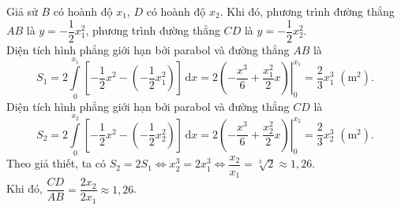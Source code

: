 \begin{ex}
{{}
Giả sử $B$ có hoành độ $x_1$,  $D$ có hoành độ $x_2$. Khi đó, phương trình đường thẳng $AB$ là $y=-\dfrac{1}{2} x_1^2$, phương trình đường thẳng $CD$ là $y=-\dfrac{1}{2} x_2^2$.\\
Diện tích hình phẳng giới hạn bởi parabol và đường thẳng $AB$ là
\[
S_1=2\displaystyle\int\limits_0^{x_1}\left[-\dfrac 12x^2-\left(-\dfrac 12x_1^2\right)\right]\mathrm{\,d} x=\left.2\left(-\dfrac{x^3}6+\dfrac{x_1^2}2x\right)\right|_0^{x_1}=\dfrac 23x_1^3\,\,\left(\mathrm{m}^2\right).
\]
Diện tích hình phẳng giới hạn bởi parabol và đường thẳng $CD$ là
\[
S_2=2\displaystyle\int\limits_0^{x_2}\left[-\dfrac 12x^2-\left(-\dfrac 12x_2^2\right)\right]\mathrm{\,d} x=\left.2\left(-\dfrac{x^3}6+\dfrac{x_2^2}2x\right)\right|_0^{x_2}=\dfrac 23x_2^3\,\,\left(\mathrm{m}^2\right).
\]
Theo giả thiết, ta có  $S_2=2S_1\Leftrightarrow x_2^3=2x_1^3\Leftrightarrow\dfrac{x_2}{x_1}=\sqrt[3]2\approx 1{,}26$.\\
Khi đó, $\dfrac{CD}{AB}=\dfrac{2x_2}{2x_1}\approx 1{,}26$.
}
\end{ex}

